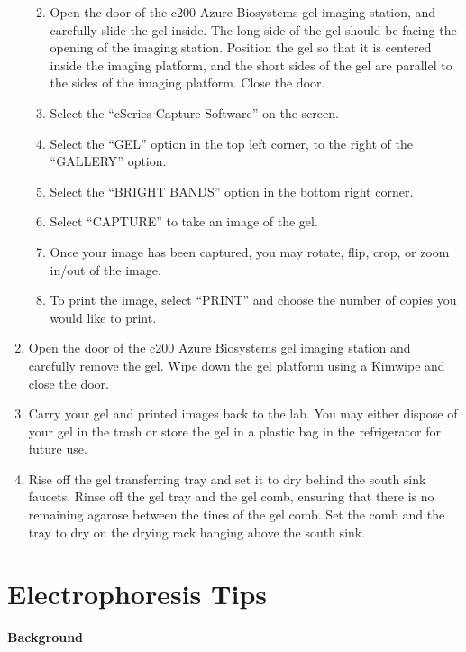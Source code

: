 \documentclass[
  letterpaper,
  DIV=11,
  numbers=noendperiod]{scrreprt}
\providecommand{\tightlist}{%
  \setlength{\itemsep}{0pt}\setlength{\parskip}{0pt}}\usepackage{longtable,booktabs,array}
\begin{document}
\begin{enumerate}
  \begin{enumerate}
  \def\labelenumii{\alph{enumii}.}
  \tightlist
  \item
    Open the door of the c200 Azure Biosystems gel imaging station, and
    carefully slide the gel inside. The long side of the gel should be
    facing the opening of the imaging station. Position the gel so that
    it is centered inside the imaging platform, and the short sides of
    the gel are parallel to the sides of the imaging platform. Close the
    door.
  \item
    Select the ``cSeries Capture Software'' on the screen.
  \item
    Select the ``GEL'' option in the top left corner, to the right of
    the ``GALLERY'' option.
  \item
    Select the ``BRIGHT BANDS'' option in the bottom right corner.
  \item
    Select ``CAPTURE'' to take an image of the gel.
  \item
    Once your image has been captured, you may rotate, flip, crop, or
    zoom in/out of the image.
  \item
    To print the image, select ``PRINT'' and choose the number of copies
    you would like to print.
  \end{enumerate}
\item
  Open the door of the c200 Azure Biosystems gel imaging station and
  carefully remove the gel. Wipe down the gel platform using a Kimwipe
  and close the door.
\item
  Carry your gel and printed images back to the lab. You may either
  dispose of your gel in the trash or store the gel in a plastic bag in
  the refrigerator for future use.
\item
  Rise off the gel transferring tray and set it to dry behind the south
  sink faucets. Rinse off the gel tray and the gel comb, ensuring that
  there is no remaining agarose between the tines of the gel comb. Set
  the comb and the tray to dry on the drying rack hanging above the
  south sink.
\end{enumerate}

\hypertarget{electrophoresis-tips}{%
\section{Electrophoresis Tips}\label{electrophoresis-tips}}

\textbf{Background}
\end{document}
